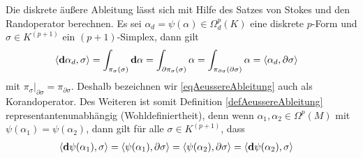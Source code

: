   \begin{folgerung}
    Die diskrete äußere Ableitung lässt sich mit Hilfe des Satzes von Stokes und den Randoperator berechnen.
    Es sei \( \alpha_{d}=\psi(\alpha)\in\Omega_{d}^{p}(K) \) eine diskrete \( p \)-Form und \( \sigma\in K^{(p+1)} \) ein \( (p+1) \)-Simplex, dann gilt
    \begin{align}
      \left\langle \mathbf{d}\alpha_{d} , \sigma \right\rangle &= \int_{\pi_{\sigma}(\sigma)} \mathbf{d}\alpha 
                                                          = \int_{\partial\pi_{\sigma}(\sigma)} \alpha
                                                          = \int_{\pi_{\partial\sigma}(\partial\sigma)} \alpha
                                                          = \left\langle \alpha_{d} , \partial\sigma \right\rangle
    \end{align}
    mit \( \pi_{\sigma}|_{\partial\sigma} = \pi_{\partial\sigma} \).
    Deshalb bezeichnen wir \eqref{eqAeussereAbleitung} auch als Korandoperator.
    Des Weiteren ist somit Definition \ref{defAeussereAbleitung} representantenunabhängig (Wohldefiniertheit),
    denn wenn \( \alpha_{1},\alpha_{2} \in \Omega^{p}(M) \) mit \( \psi(\alpha_{1}) = \psi(\alpha_{2}) \), 
    dann gilt für alle \( \sigma\in K^{(p+1)} \), dass
    \begin{align}
      \left\langle \mathbf{d}\psi(\alpha_{1}), \sigma \right\rangle &= \left\langle \psi(\alpha_{1}), \partial\sigma \right\rangle
                                                               = \left\langle \psi(\alpha_{2}), \partial\sigma \right\rangle
                                                               = \left\langle \mathbf{d}\psi(\alpha_{2}), \sigma \right\rangle
    \end{align}
  \end{folgerung}
  
